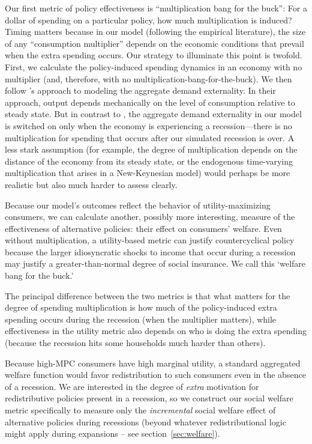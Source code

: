 \documentclass[\econtexRoot/HAFiscal]{subfiles}
\begin{document}
Our first metric of policy effectiveness is ``multiplication bang for the buck'': For a dollar of spending on a particular policy, how much multiplication is induced?  Timing matters because in our model (following the empirical literature), the size of any ``consumption multiplier'' depends on the economic conditions that prevail when the extra spending occurs.  Our strategy to illuminate this point is twofold.  First, we calculate the policy-induced spending dynamics in an economy with no multiplier (and, therefore, with no multiplication-bang-for-the-buck).  We then follow \cite{kmpHandbook2016}'s approach to modeling the aggregate demand externality.  In their approach, output depends mechanically on the level of consumption relative to steady state. But in contrast to \cite{kmpHandbook2016}, the aggregate demand externality in our model is switched on only when the economy is experiencing a recession---there is no multiplication for spending that occurs after our simulated recession is over.  A less stark assumption (for example, the degree of multiplication depends on the distance of the economy from its steady state, or the endogenous time-varying multiplication that arises in a New-Keynesian model) would perhaps be more realistic but also much harder to assess clearly.

Because our model's outcomes reflect the behavior of utility-maximizing consumers, we can calculate another, possibly more interesting, measure of the effectiveness of alternative policies:  their effect on consumers' welfare.  Even without multiplication, a utility-based metric can justify countercyclical policy because the larger idiosyncratic shocks to income that occur during a recession may justify a greater-than-normal degree of social insurance.  We call this `welfare bang for the buck.'

The principal difference between the two metrics is that what matters for the degree of spending multiplication is how much of the policy-induced extra spending occurs during the recession (when the multiplier matters), while effectiveness in the utility metric also depends on who is doing the extra spending (because the recession hits some households much harder than others).

Because high-MPC consumers have high marginal utility, a standard aggregated welfare function would favor redistribution to such consumers even in the absence of a recession. We are interested in the degree of \textit{extra} motivation for redistributive policies present in a recession, so we construct our social welfare metric specifically to measure only the \textit{incremental} social welfare effect of alternative policies during recessions (beyond whatever redistributional logic might apply during expansions -- see section~\ref{sec:welfare}).
\end{document}
